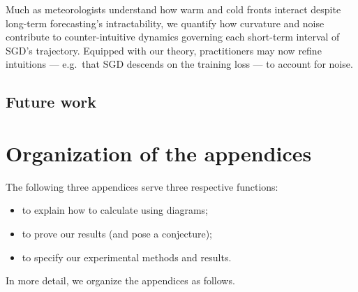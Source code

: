 \documentclass[final,12pt]{colt2021} %
\begin{document}
            Much as meteorologists understand how warm and cold fronts interact
            despite long-term forecasting's intractability, we quantify how
            curvature and noise contribute to counter-intuitive dynamics
            governing each short-term interval of SGD's trajectory.  Equipped
            with our theory, practitioners may now refine intuitions --- e.g.\
            that SGD descends on the training loss --- to account for noise.
    
    
        \subsection{Future work}
    
    
    
    
    \appendix

    \newpage
    \section*{Organization of the appendices}
        The following three appendices serve three respective functions:
        \setlist{nolistsep}
        \begin{itemize}[noitemsep]
            \item to explain how to calculate using diagrams;
            \item to prove our results (and pose a conjecture);
            \item to specify our experimental methods and results.
        \end{itemize}
        In more detail, we organize the appendices as follows.\\
    
\end{document}
